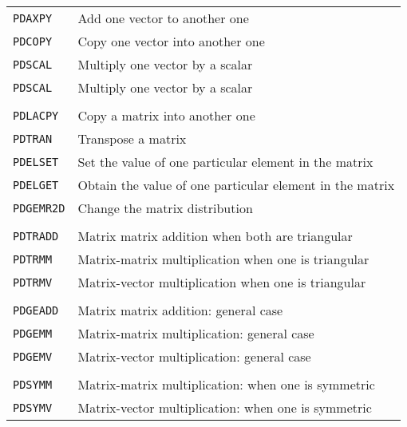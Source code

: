 \documentclass[aps,prb,reprint,showpacs]{revtex4-1}
\begin{document}
\begin{table*}[h!]
\begin{tabular}{ll}
\texttt{PDAXPY}  &   Add one vector to another one \\
\texttt{PDCOPY}  &   Copy one vector into another one \\
\texttt{PDSCAL}  &   Multiply one vector by a scalar \\
\texttt{PDSCAL}  &   Multiply one vector by a scalar \\
\\
\texttt{PDLACPY} &   Copy a matrix into another one \\
\texttt{PDTRAN}  &   Transpose a matrix \\
\texttt{PDELSET} &   Set the value of one particular element in the matrix \\
\texttt{PDELGET} &   Obtain the value of one particular element in the matrix \\
\texttt{PDGEMR2D}&   Change the matrix distribution \\
\\
\texttt{PDTRADD} &   Matrix matrix addition when both are triangular \\
\texttt{PDTRMM}  &   Matrix-matrix multiplication when one is triangular \\
\texttt{PDTRMV}  &   Matrix-vector multiplication when one is triangular \\
\\
\texttt{PDGEADD} &   Matrix matrix addition: general case \\
\texttt{PDGEMM}  &   Matrix-matrix multiplication: general case \\
\texttt{PDGEMV}  &   Matrix-vector multiplication: general case \\
\\
\texttt{PDSYMM}  &   Matrix-matrix multiplication: when one is symmetric \\
\texttt{PDSYMV}  &   Matrix-vector multiplication: when one is symmetric \\
\end{tabular}
\end{table*}
\end{document}
